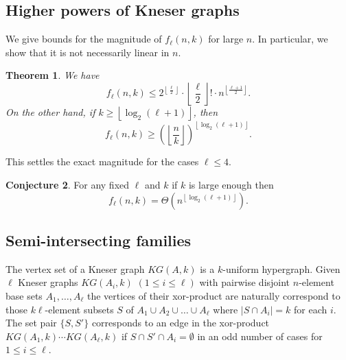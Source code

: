 \documentclass[12pt,a4paper]{amsart}
\numberwithin{equation}{section}
\theoremstyle{plain}
\newtheorem{Th}{Theorem}[section]
\theoremstyle{definition}
\newtheorem{Conj}[Th]{Conjecture}
\newcommand{\NN}{n}
\begin{document}
\subsection{Higher powers of Kneser graphs} \label{ss_14}

We give bounds for the magnitude of $f_\ell(\NN,k)$ for large $\NN$. In particular, we show that it is not necessarily  linear in $\NN$.

\begin{Th} \label{thm_generalpowers}
We have
\begin{equation}\label{eq13}
 f_\ell(\NN,k)\leq  2^{\left\lfloor \frac{\ell}{2} \right\rfloor}\cdot  \left\lfloor \frac{\ell}{2} \right\rfloor !  \cdot \NN^{\left\lfloor \frac{\ell+1}{2} \right\rfloor} .
 \end{equation}
On the other hand, if $k \geq \left\lfloor \log_2(\ell+1)\right\rfloor$, then
 \begin{equation}\label{eq14}
    f_\ell(\NN,k) \geq \left(\left\lfloor \frac{\NN}{k} \right\rfloor \right)^{\left\lfloor \log_2(\ell+1)\right\rfloor} .
    \end{equation}
\end{Th}

This settles the exact magnitude for the cases $\ell\leq 4$.

\begin{Conj}
For any fixed $\ell$ and $k$ if $k$ is  large enough then
    $$f_\ell(\NN,k)=\Theta(n^{\left\lfloor \log_2(\ell+1)\right\rfloor}).$$
\end{Conj}


\subsection{Semi-intersecting families}

The vertex set of a Kneser graph $KG(A,k)$ is a $k$-uniform hypergraph.
Given $\ell$ Kneser graphs $KG(A_i,k)$ $(1\leq i\leq \ell)$ with pairwise disjoint $n$-element base sets $A_1, \dots, A_\ell$
 the vertices of their xor-product %
 are naturally correspond to those $k\ell$-element subsets $S$ of
 $A_1 \cup A_2 \cup \ldots \cup A_\ell $ where %
 $|S\cap A_i|=k$ for each $i$.
The set pair $\{ S, S'\}$ corresponds to an edge in the xor-product $KG(A_1,k)\cdots KG(A_\ell,k)$ if $S\cap S'\cap A_i=\emptyset$ in an odd number of cases for $1\leq i\leq \ell$.
\end{document}
